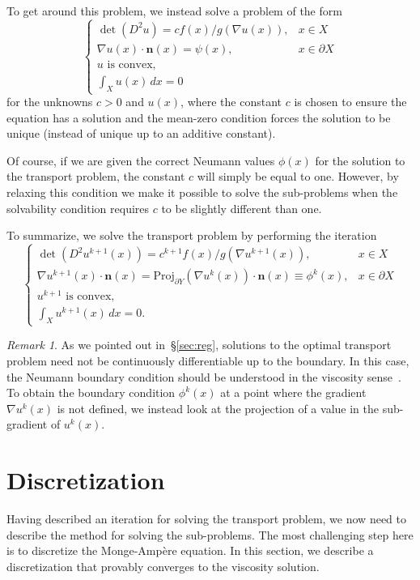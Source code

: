 \documentclass{amsart}
\theoremstyle{lemma}
\theoremstyle{remark}
\newtheorem{remark}{Remark}
\begin{document}
To get around this problem, we instead solve a problem of the form
\[
\begin{cases}
\det(D^2u) = c f(x)/g(\nabla u(x)), & x\in X\\
\nabla u(x)\cdot{\mathbf{n}}(x) = \psi(x), & x\in\partial X\\
u \text{ is convex},\\
\int_X u(x)\,dx = 0
\end{cases}
\]
for the unknowns $c>0$ and $u(x)$, where the constant $c$ is chosen to ensure the equation has a solution and the mean-zero condition forces the solution to be unique (instead of unique up to an additive constant).

Of course, if we are given the correct Neumann values $\phi(x)$ for the solution to the transport problem, the constant $c$ will simply be equal to one.  However, by relaxing this condition we make it possible to solve the sub-problems when the solvability condition requires $c$ to be slightly different than one.

To summarize, we solve the transport problem by performing the iteration
\begin{equation}\label{eq:it2}
\begin{cases}
\det(D^2{u^{k+1}}(x)) = {c^{k+1}} f(x)/g(\nabla{u^{k+1}}(x)), & x\in X\\
\nabla{u^{k+1}}(x)\cdot{\mathbf{n}}(x) = \text{Proj}_{\partial Y} (\nabla{u^k}(x))\cdot{\mathbf{n}}(x) \equiv {\phi^k}(x), & x\in\partial X\\
{u^{k+1}} \text{ is convex,}\\
\int_X {u^{k+1}}(x)\,dx = 0.
\end{cases}
\end{equation}

\begin{remark}
As we pointed out in~\S\ref{sec:reg}, solutions to the optimal transport problem need not be continuously differentiable up to the boundary.  In this case, the Neumann boundary condition should be understood in the viscosity sense~\cite{LionsNeumannHJ}.  To obtain the boundary condition ${\phi^k}(x)$ at a point where the gradient $\nabla{u^k}(x)$ is not defined, we instead look at the projection of a value in the sub-gradient of ${u^k}(x)$.
\end{remark}

\section{Discretization}\label{sec:discretize}
Having described an iteration for solving the transport problem, we now need to describe the method for solving the sub-problems.  The most challenging step here is to discretize the {{Monge-Amp\`ere}\xspace} equation.  In this section, we describe a discretization that provably converges to the viscosity solution.
\end{document}
